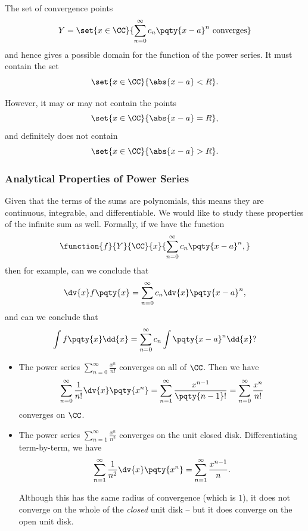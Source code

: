 \begin{remark}
    The set of convergence points
    \[
        Y = \set{x \in \CC}{\sum_{n = 0}^{\infty} c_n \pqty{x - a}^n \text{ converges}}
    \]
    and hence gives a possible domain for the function of the power series. It must contain the set
    \[
        \set{x \in \CC}{\abs{x - a} < R}.
    \]

    However, it may or may not contain the points
    \[
        \set{x \in \CC}{\abs{x - a} = R},
    \]
    and definitely does not contain
    \[
        \set{x \in \CC}{\abs{x - a} > R}.
    \]
\end{remark}

\subsubsection{Analytical Properties of Power Series}

Given that the terms of the sums are polynomials, this means they are continuous, integrable, and differentiable. We would like to study these properties of the infinite sum as well. Formally, if we have the function
\[
    \function{f}{Y}{\CC}{x}{\sum_{n = 0}^{\infty} c_n \pqty{x - a}^n,}
\]
then for example, can we conclude that
\[
    \dv{x} f\pqty{x} = \sum_{n = 0}^{\infty} c_n \dv{x} \pqty{x - a}^n,
\]
and can we conclude that
\[
    \int f\pqty{x} \dd{x} = \sum_{n = 0}^{\infty} c_n \int \pqty{x - a}^{n} \dd{x}?
\]

\begin{example}
    \label{ex:differentiating-power-series-term-by-term}%
    \begin{itemize}
        \item The power series \(\sum_{n = 0}^{\infty} \frac{x^n}{n!}\) converges on all of \(\CC\). Then we have
        \[
            \sum_{n = 0}^{\infty} \frac{1}{n!} \dv{x} \pqty{x^n} = \sum_{n = 1}^{\infty} \frac{x^{n - 1}}{\pqty{n - 1}!} = \sum_{n = 0}^{\infty} \frac{x^n}{n!}
        \]
        converges on \(\CC\).

        \item The power series \(\sum_{n = 1}^{\infty} \frac{x^n}{n^2}\) converges on the unit closed disk. Differentiating term-by-term, we have
        \[
            \sum_{n = 1}^{\infty} \frac{1}{n^2} \dv{x} \pqty{x^n} = \sum_{n = 1}^{\infty} \frac{x^{n - 1}}{n}.
        \]

        Although this has the same radius of convergence (which is \(1\)), it does not converge on the whole of the \emph{closed} unit disk -- but it does converge on the open unit disk.
    \end{itemize}
\end{example}

